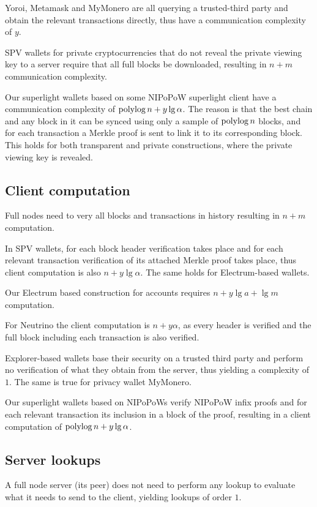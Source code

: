 Yoroi, Metamask and MyMonero are all querying a trusted-third party and obtain the relevant transactions directly, thus have a communication complexity of $y$.

SPV wallets for private cryptocurrencies that do not reveal the private viewing key to a server require that all full blocks be downloaded, resulting in $n+m$ communication complexity.

Our superlight wallets based on some NIPoPoW superlight client have a communication complexity of $\operatorname{polylog}{n} + y\lg{\alpha}$. The reason is that the best chain and any block in it can be synced using only a sample of $\operatorname{polylog}{n}$ blocks, and for each transaction a Merkle proof is sent to link it to its corresponding block. This holds for both transparent and private constructions, where the private viewing key is revealed.

\subsection{Client computation}
Full nodes need to very all blocks and transactions in history resulting in $n+m$ computation.

In SPV wallets, for each block header verification takes place and for each relevant transaction verification of its attached Merkle proof takes place, thus client computation is also $n+y\lg{\alpha}$. The same holds for Electrum-based wallets.

Our Electrum based construction for accounts requires $n+y\lg{a}+\lg{m}$ computation.

For Neutrino the client computation is $n+y\alpha$, as every header is verified and the full block including each transaction is also verified.

Explorer-based wallets base their security on a trusted third party and perform no verification of what they obtain from the server, thus yielding a complexity of $1$. The same is true for privacy wallet MyMonero.

Our superlight wallets based on NIPoPoWs verify NIPoPoW infix proofs and for each relevant transaction its inclusion in a block of the proof, resulting in a client computation of $\operatorname{polylog}{n} + y\lg{\alpha}$.

\subsection{Server lookups}

A full node server (its peer) does not need to perform any lookup to evaluate what it needs to send to the client, yielding lookups of order $1$.

